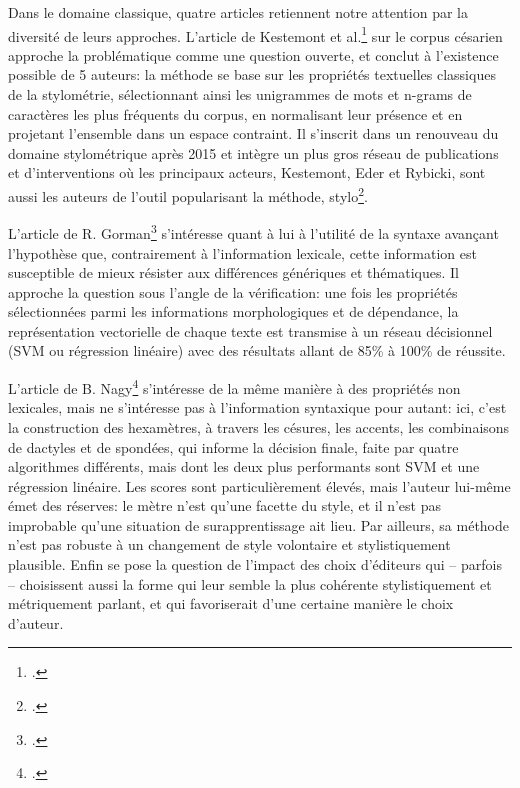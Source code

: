 Dans le domaine classique, quatre articles retiennent notre attention par la diversité de leurs approches. L'article de Kestemont et al.\footcite{kestemont_authenticating_2016} sur le corpus césarien approche la problématique comme une question ouverte, et conclut à l'existence possible de 5 auteurs: la méthode se base sur les propriétés textuelles classiques de la stylométrie, sélectionnant ainsi les unigrammes de mots et n-grams de caractères les plus fréquents du corpus, en normalisant leur présence et en projetant l'ensemble dans un espace contraint. Il s'inscrit dans un renouveau du domaine stylométrique après 2015 et intègre un plus gros réseau de publications et d'interventions où les principaux acteurs, Kestemont, Eder et Rybicki, sont aussi les auteurs de l'outil popularisant la méthode, stylo\footcite{stylo_r}. %

L'article de R. Gorman\footcite{gorman_author_2020} s'intéresse quant à lui à l'utilité de la syntaxe avançant l'hypothèse que, contrairement à l'information lexicale, cette information est susceptible de mieux résister aux différences génériques et thématiques. Il approche la question sous l'angle de la vérification: une fois les propriétés sélectionnées parmi les informations morphologiques et de dépendance, la représentation vectorielle de chaque texte est transmise à un réseau décisionnel (SVM ou régression linéaire) avec des résultats allant de 85\% à 100\% de réussite.

L'article de B. Nagy\footcite{nagy_metre_2021} s'intéresse de la même manière à des propriétés non lexicales, mais ne s'intéresse pas à l'information syntaxique pour autant: ici, c'est la construction des hexamètres, à travers les césures, les accents, les combinaisons de dactyles et de spondées, qui informe la décision finale, faite par quatre algorithmes différents, mais dont les deux plus performants sont SVM et une régression linéaire. Les scores sont particulièrement élevés, mais l'auteur lui-même émet des réserves: le mètre n'est qu'une facette du style, et il n'est pas improbable qu'une situation de surapprentissage ait lieu. Par ailleurs, sa méthode n'est pas robuste à un changement de style volontaire et stylistiquement plausible. Enfin se pose la question de l'impact des choix d'éditeurs qui -- parfois -- choisissent aussi la forme qui leur semble la plus cohérente stylistiquement et métriquement parlant, et qui favoriserait d'une certaine manière le choix d'auteur. 

